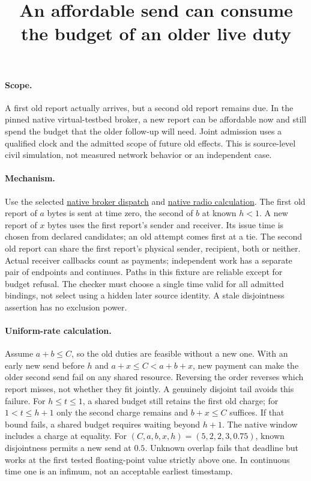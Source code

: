 \documentclass[11pt]{article}
\title{An affordable send can consume the budget of an older live duty}
\date{}
\begin{document}
\maketitle
\paragraph{Scope.}
A first old report actually arrives, but a second old report remains due.
In the pinned native virtual-testbed broker, a new report can be affordable
now and still spend the budget that the older follow-up will need. Joint
admission uses a qualified clock and the admitted scope of future old
effects. This is source-level civil simulation, not measured network
behavior or an independent case.

\paragraph{Mechanism.}
Use the selected
\href{https://github.com/osrf/subt/blob/083c6a8acb0c25aa1a35e34517e628cd3b52ae77/subt-communication/subt_communication_broker/src/subt_communication_broker.cpp}
{native broker dispatch} and
\href{https://github.com/osrf/subt/blob/083c6a8acb0c25aa1a35e34517e628cd3b52ae77/subt-communication/subt_communication_model/src/subt_communication_model.cpp}
{native radio calculation}.
The first old report of $a$ bytes is sent at time zero, the second of
$b$ at known $h<1$. A new report of $x$ bytes uses the first report's
sender and receiver. Its issue time is chosen from declared candidates;
an old attempt comes first at a tie. The second old report can share
the first report's physical sender, recipient, both or neither.
Actual receiver callbacks count as payments; independent work has a
separate pair of endpoints and continues. Paths in this fixture are
reliable except for budget refusal. The checker must choose a single
time valid for all admitted bindings, not select using a hidden
later source identity. A stale disjointness assertion has no
exclusion power.

\paragraph{Uniform-rate calculation.}
Assume $a+b\le C$, so the old duties are feasible without a new one.
With an early new send before $h$ and $a+x\le C<a+b+x$, new payment
can make the older second send fail on any shared resource. Reversing
the order reverses which report misses, not whether they fit jointly.
A genuinely disjoint tail avoids this failure. For $h\le t\le1$, a
shared budget still retains the first old charge; for $1<t\le h+1$
only the second charge remains and $b+x\le C$ suffices. If that bound
fails, a shared budget requires waiting beyond $h+1$. The native
window includes a charge at equality.
For $(C,a,b,x,h)=(5,2,2,3,0.75)$, known disjointness permits a new
send at $0.5$. Unknown overlap fails that deadline but works at the
first tested floating-point value strictly above one. In continuous
time one is an infimum, not an acceptable earliest timestamp.
\end{document}
